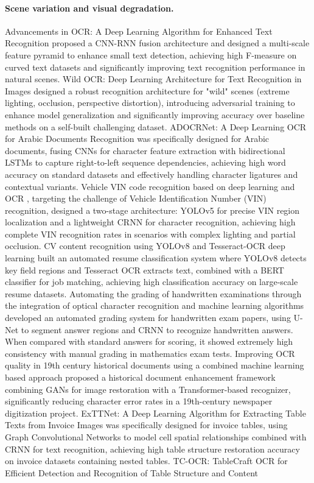 \paragraph{Scene variation and visual degradation.}
Advancements in OCR: A Deep Learning Algorithm for Enhanced Text Recognition \cite{khan2023advancements} proposed a CNN-RNN fusion architecture and designed a multi-scale feature pyramid to enhance small text detection, achieving high F-measure on curved text datasets and significantly improving text recognition performance in natural scenes. Wild OCR: Deep Learning Architecture for Text Recognition in Images \cite{wang2023wildocr} designed a robust recognition architecture for "wild" scenes (extreme lighting, occlusion, perspective distortion), introducing adversarial training to enhance model generalization and significantly improving accuracy over baseline methods on a self-built challenging dataset. ADOCRNet: A Deep Learning OCR for Arabic Documents Recognition \cite{hassan2023adocrnet} was specifically designed for Arabic documents, fusing CNNs for character feature extraction with bidirectional LSTMs to capture right-to-left sequence dependencies, achieving high word accuracy on standard datasets and effectively handling character ligatures and contextual variants. Vehicle VIN code recognition based on deep learning and OCR \cite{li2023vin}, targeting the challenge of Vehicle Identification Number (VIN) recognition, designed a two-stage architecture: YOLOv5 for precise VIN region localization and a lightweight CRNN for character recognition, achieving high complete VIN recognition rates in scenarios with complex lighting and partial occlusion. CV content recognition using YOLOv8 and Tesseract-OCR deep learning \cite{reddy2024cv} built an automated resume classification system where YOLOv8 detects key field regions and Tesseract OCR extracts text, combined with a BERT classifier for job matching, achieving high classification accuracy on large-scale resume datasets. Automating the grading of handwritten examinations through the integration of optical character recognition and machine learning algorithms \cite{garcia2023grading} developed an automated grading system for handwritten exam papers, using U-Net to segment answer regions and CRNN to recognize handwritten answers. When compared with standard answers for scoring, it showed extremely high consistency with manual grading in mathematics exam tests. Improving OCR quality in 19th century historical documents using a combined machine learning based approach \cite{roberts2023historical} proposed a historical document enhancement framework combining GANs for image restoration with a Transformer-based recognizer, significantly reducing character error rates in a 19th-century newspaper digitization project. ExTTNet: A Deep Learning Algorithm for Extracting Table Texts from Invoice Images \cite{zhang2023exttnet} was specifically designed for invoice tables, using Graph Convolutional Networks to model cell spatial relationships combined with CRNN for text recognition, achieving high table structure restoration accuracy on invoice datasets containing nested tables. TC-OCR: TableCraft OCR for Efficient Detection and Recognition of Table Structure and Content 